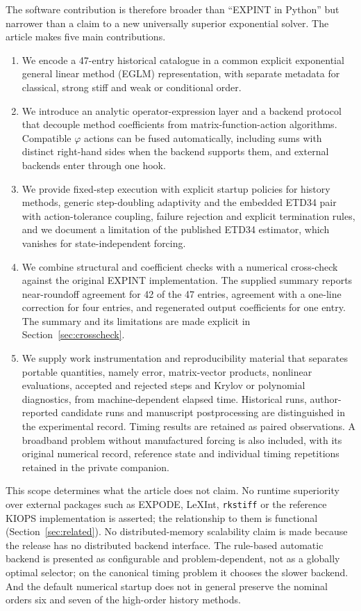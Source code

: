 The software contribution is therefore broader than ``EXPINT in Python'' but
narrower than a claim to a new universally superior exponential solver.  The
article makes five main contributions.
\begin{enumerate}[leftmargin=*,itemsep=2pt]
  \item We encode a 47-entry historical catalogue in a common explicit exponential
  general linear method (EGLM) representation, with separate
  metadata for classical, strong stiff and weak or conditional order.
  \item We introduce an analytic operator-expression layer and a backend
  protocol that decouple method coefficients from matrix-function-action
  algorithms.  Compatible $\varphi$ actions can be fused automatically,
  including sums with distinct right-hand sides when the backend supports
  them, and external backends enter through one hook.
  \item We provide fixed-step execution with explicit startup policies for
  history methods, generic step-doubling adaptivity and the embedded ETD34
  pair with action-tolerance coupling, failure rejection and explicit
  termination rules, and we document a limitation of the published ETD34
  estimator, which vanishes for state-independent forcing.
  \item We combine structural and coefficient checks with a numerical
  cross-check against the original EXPINT implementation.  The supplied
  summary reports near-roundoff agreement for 42 of the 47 entries,
  agreement with a one-line correction for four entries, and regenerated
  output coefficients for one entry.  The summary and its limitations are
  made explicit in Section~\ref{sec:crosscheck}.
  \item We supply work instrumentation and reproducibility material that
  separates portable quantities, namely error, matrix-vector products,
  nonlinear evaluations, accepted and rejected steps and Krylov or polynomial
  diagnostics, from machine-dependent elapsed time.  Historical runs, author-reported candidate runs and manuscript
  postprocessing are distinguished in the experimental record.  Timing
  results are retained as paired observations.  A broadband problem without
  manufactured forcing is also included, with its original numerical record, reference state and individual timing
  repetitions retained in the private companion.
\end{enumerate}

This scope determines what the article does not claim.  No runtime
superiority over external packages such as EXPODE, LeXInt, \texttt{rkstiff} or
the reference KIOPS implementation is asserted; the relationship to them is
functional (Section~\ref{sec:related}).  No distributed-memory scalability
claim is made because the release has no distributed backend interface.  The
rule-based automatic backend is presented as configurable and
problem-dependent, not as a globally optimal selector; on the canonical
timing problem it chooses the slower backend.  And the default numerical
startup does not in general preserve the nominal orders six and seven of the
high-order history methods.

